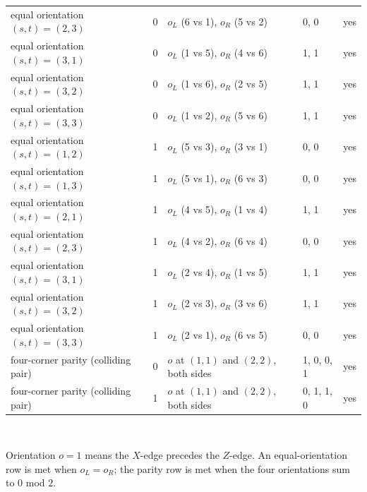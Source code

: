 \begin{table}[tb]
\begin{tabular}{llllc}
equal orientation $(s,t)=(2,3)$ & 0 & $o_L$ (6 vs 1), $o_R$ (5 vs 2) & 0, 0 & yes \\
equal orientation $(s,t)=(3,1)$ & 0 & $o_L$ (1 vs 5), $o_R$ (4 vs 6) & 1, 1 & yes \\
equal orientation $(s,t)=(3,2)$ & 0 & $o_L$ (1 vs 6), $o_R$ (2 vs 5) & 1, 1 & yes \\
equal orientation $(s,t)=(3,3)$ & 0 & $o_L$ (1 vs 2), $o_R$ (5 vs 6) & 1, 1 & yes \\
equal orientation $(s,t)=(1,2)$ & 1 & $o_L$ (5 vs 3), $o_R$ (3 vs 1) & 0, 0 & yes \\
equal orientation $(s,t)=(1,3)$ & 1 & $o_L$ (5 vs 1), $o_R$ (6 vs 3) & 0, 0 & yes \\
equal orientation $(s,t)=(2,1)$ & 1 & $o_L$ (4 vs 5), $o_R$ (1 vs 4) & 1, 1 & yes \\
equal orientation $(s,t)=(2,3)$ & 1 & $o_L$ (4 vs 2), $o_R$ (6 vs 4) & 0, 0 & yes \\
equal orientation $(s,t)=(3,1)$ & 1 & $o_L$ (2 vs 4), $o_R$ (1 vs 5) & 1, 1 & yes \\
equal orientation $(s,t)=(3,2)$ & 1 & $o_L$ (2 vs 3), $o_R$ (3 vs 6) & 1, 1 & yes \\
equal orientation $(s,t)=(3,3)$ & 1 & $o_L$ (2 vs 1), $o_R$ (6 vs 5) & 0, 0 & yes \\
four-corner parity (colliding pair) & 0 & $o$ at $(1,1)$ and $(2,2)$, both sides & 1, 0, 0, 1 & yes \\
four-corner parity (colliding pair) & 1 & $o$ at $(1,1)$ and $(2,2)$, both sides & 0, 1, 1, 0 & yes \\
\bottomrule
\end{tabular}
\\[2pt]\begin{minipage}{\linewidth}\footnotesize Orientation $o=1$ means the $X$-edge precedes the $Z$-edge.  An equal-orientation row is met when $o_L=o_R$; the parity row is met when the four orientations sum to $0$ mod $2$.\end{minipage}
\end{table}
